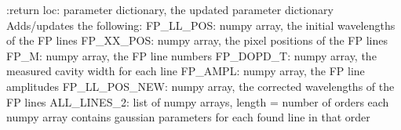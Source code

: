 \begin{minipage}{\textwidth}
\begin{pythondocstring}
:return loc: parameter dictionary, the updated parameter dictionary
        Adds/updates the following:
            FP_LL_POS: numpy array, the initial wavelengths of the FP lines
            FP_XX_POS: numpy array, the pixel positions of the FP lines
            FP_M: numpy array, the FP line numbers
            FP_DOPD_T: numpy array, the measured cavity width for each line
            FP_AMPL: numpy array, the FP line amplitudes
            FP_LL_POS_NEW: numpy array, the corrected wavelengths of the
                           FP lines
            ALL_LINES_2: list of numpy arrays, length = number of orders
                         each numpy array contains gaussian parameters
                         for each found line in that order
\end{pythondocstring}
\end{minipage}

